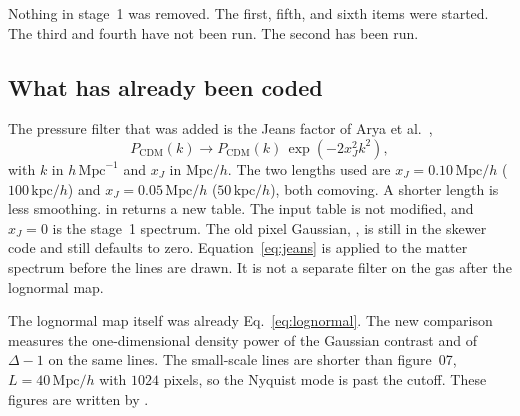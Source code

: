 \documentclass[11pt]{article}
\begin{document}
Nothing in stage~1 was removed. The first, fifth, and sixth items were started. The third and fourth have not been run. The second has been run.

\subsection{What has already been coded}

The pressure filter that was added is the Jeans factor of Arya et al.\ \cite{Arya:2022uke},
\begin{equation}
\label{eq:jeans}
P_\mathrm{CDM}(k)\to P_\mathrm{CDM}(k)\,\exp(-2 x_J^{2} k^{2}),
\end{equation}
with $k$ in $h\,\mathrm{Mpc}^{-1}$ and $x_J$ in $\mathrm{Mpc}/h$. The two lengths used are $x_J=0.10\,\mathrm{Mpc}/h$ ($100\,\mathrm{kpc}/h$) and $x_J=0.05\,\mathrm{Mpc}/h$ ($50\,\mathrm{kpc}/h$), both comoving. A shorter length is less smoothing.  in  returns a new table. The input table is not modified, and $x_J=0$ is the stage~1 spectrum. The old pixel Gaussian, , is still in the skewer code and still defaults to zero. Equation~\eqref{eq:jeans} is applied to the matter spectrum before the lines are drawn. It is not a separate filter on the gas after the lognormal map.

The lognormal map itself was already Eq.~\eqref{eq:lognormal}. The new comparison measures the one-dimensional density power of the Gaussian contrast and of $\Delta-1$ on the same lines. The small-scale lines are shorter than figure~07, $L=40\,\mathrm{Mpc}/h$ with $1024$ pixels, so the Nyquist mode is past the cutoff. These figures are written by .
\end{document}
